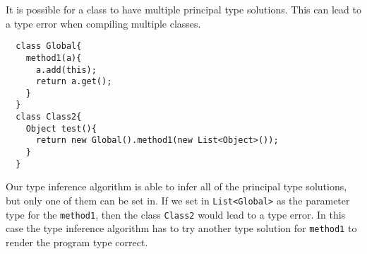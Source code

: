 It is possible for a class to have multiple principal type solutions.
This can lead to a type error when compiling multiple classes.
\begin{lstlisting}
  class Global{
    method1(a){
      a.add(this);
      return a.get();
    }
  }
  class Class2{
    Object test(){
      return new Global().method1(new List<Object>());
    }
  }
\end{lstlisting}
Our type inference algorithm is able to infer all of the principal type solutions, but only one of them can be set in.
If we set in \texttt{List<Global>} as the parameter type for the \texttt{method1},
then the class \texttt{Class2} would lead to a type error.
In this case the type inference algorithm has to try another type solution for \texttt{method1}
to render the program type correct.

